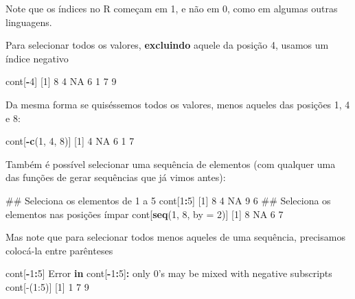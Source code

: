 \documentclass[10pt,a4paper]{book}
\newenvironment{Shaded}{\begin{snugshade}}{\end{snugshade}}
\newcommand{\KeywordTok}[1]{\textcolor[rgb]{0.13,0.29,0.53}{\textbf{#1}}}
\newcommand{\DataTypeTok}[1]{\textcolor[rgb]{0.13,0.29,0.53}{#1}}
\newcommand{\DecValTok}[1]{\textcolor[rgb]{0.00,0.00,0.81}{#1}}
\newcommand{\StringTok}[1]{\textcolor[rgb]{0.31,0.60,0.02}{#1}}
\newcommand{\OtherTok}[1]{\textcolor[rgb]{0.56,0.35,0.01}{#1}}
\newcommand{\ControlFlowTok}[1]{\textcolor[rgb]{0.13,0.29,0.53}{\textbf{#1}}}
\newcommand{\OperatorTok}[1]{\textcolor[rgb]{0.81,0.36,0.00}{\textbf{#1}}}
\newcommand{\NormalTok}[1]{#1}
\begin{document}
Note que os índices no R começam em 1, e não em 0, como em algumas
outras linguagens.

Para selecionar todos os valores, \textbf{excluindo} aquele da posição
4, usamos um índice negativo

\begin{Shaded}
\begin{Highlighting}[]
\NormalTok{cont[}\OperatorTok{-}\DecValTok{4}\NormalTok{]}
\NormalTok{[}\DecValTok{1}\NormalTok{]  }\DecValTok{8}  \DecValTok{4} \OtherTok{NA}  \DecValTok{6}  \DecValTok{1}  \DecValTok{7}  \DecValTok{9}
\end{Highlighting}
\end{Shaded}

Da mesma forma se quiséssemos todos os valores, menos aqueles das
posições 1, 4 e 8:

\begin{Shaded}
\begin{Highlighting}[]
\NormalTok{cont[}\OperatorTok{-}\KeywordTok{c}\NormalTok{(}\DecValTok{1}\NormalTok{, }\DecValTok{4}\NormalTok{, }\DecValTok{8}\NormalTok{)]}
\NormalTok{[}\DecValTok{1}\NormalTok{]  }\DecValTok{4} \OtherTok{NA}  \DecValTok{6}  \DecValTok{1}  \DecValTok{7}
\end{Highlighting}
\end{Shaded}

Também é possível selecionar uma sequência de elementos (com qualquer
uma das funções de gerar sequências que já vimos antes):

\begin{Shaded}
\begin{Highlighting}[]
\NormalTok{## Seleciona os elementos de 1 a 5}
\NormalTok{cont[}\DecValTok{1}\OperatorTok{:}\DecValTok{5}\NormalTok{]}
\NormalTok{[}\DecValTok{1}\NormalTok{]  }\DecValTok{8}  \DecValTok{4} \OtherTok{NA}  \DecValTok{9}  \DecValTok{6}
\NormalTok{## Seleciona os elementos nas posições ímpar}
\NormalTok{cont[}\KeywordTok{seq}\NormalTok{(}\DecValTok{1}\NormalTok{, }\DecValTok{8}\NormalTok{, }\DataTypeTok{by =} \DecValTok{2}\NormalTok{)]}
\NormalTok{[}\DecValTok{1}\NormalTok{]  }\DecValTok{8} \OtherTok{NA}  \DecValTok{6}  \DecValTok{7}
\end{Highlighting}
\end{Shaded}

Mas note que para selecionar todos menos aqueles de uma sequência,
precisamos colocá-la entre parênteses

\begin{Shaded}
\begin{Highlighting}[]
\NormalTok{cont[}\OperatorTok{-}\DecValTok{1}\OperatorTok{:}\DecValTok{5}\NormalTok{]}
\NormalTok{Error }\ControlFlowTok{in}\NormalTok{ cont[}\OperatorTok{-}\DecValTok{1}\OperatorTok{:}\DecValTok{5}\NormalTok{]}\OperatorTok{:}\StringTok{ }\NormalTok{only }\DecValTok{0}\StringTok{'s may be mixed with negative subscripts}
\StringTok{cont[-(1:5)]}
\StringTok{[1] 1 7 9}
\end{Highlighting}
\end{Shaded}
\end{document}
